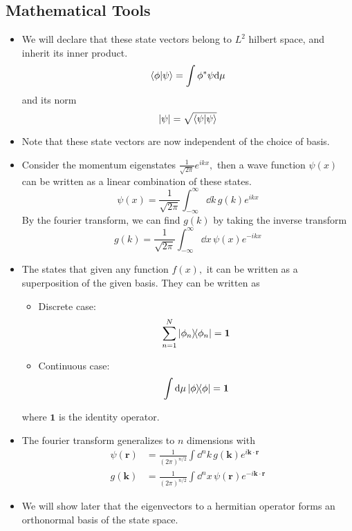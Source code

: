 \documentclass[12pt]{article}
\begin{document}
\subsection{Mathematical Tools}
\begin{itemize}
    \item We will declare that these state vectors belong to $L^2$ hilbert space, and inherit its inner product.\begin{equation}
        \braket{\phi}{\psi}=\int\phi^*\psi\dd\mu
    \end{equation}
    and its norm \begin{equation}
        |\psi|=\sqrt{\braket{\psi}{\psi}}
    \end{equation}
    \item Note that these state vectors are now independent of the choice of basis.
    \item Consider the momentum eigenstates $\frac{1}{\sqrt{2\pi}}e^{ikx},$ then a wave function $\psi(x)$ can be written as a linear combination of these states. \begin{equation}
        \psi(x)=\frac{1}{\sqrt{2\pi}}\int_{-\infty}^\infty\dd k\, g(k)e^{ikx}
    \end{equation}
    By the fourier transform, we can find $g(k)$ by taking the inverse transform \begin{equation}
        g(k)=\frac{1}{\sqrt{2\pi}}\int_{-\infty}^\infty\dd x\, \psi(x)e^{-ikx}
    \end{equation}
    \item The  states that given any function $f(x),$ it can be written as a superposition of the given basis. They can be written as \begin{itemize}
        \item Discrete case:\begin{equation}
            \sum_{n=1}^N\ketbra{\phi_n}{\phi_n}=\mathbf 1
        \end{equation}
        \item Continuous case:\begin{equation}
            \int\dd\mu\ketbra{\phi}{\phi}=\mathbf 1
        \end{equation}
    \end{itemize}
    where $\mathbf 1$ is the identity operator.
    \item The fourier transform generalizes to $n$ dimensions with \begin{align}
        \psi(\mathbf r)&=\frac{1}{(2\pi)^{n/2}}\int\dd^nk\, g(\mathbf k)e^{i\mathbf k\cdot\mathbf r}\\
        g(\mathbf k)&=\frac{1}{(2\pi)^{n/2}}\int\dd^nx\, \psi(\mathbf r)e^{-i\mathbf k\cdot\mathbf r}
    \end{align}
    \item We will show later that the eigenvectors to a hermitian operator forms an orthonormal basis of the state space.
\end{itemize}
\end{document}
